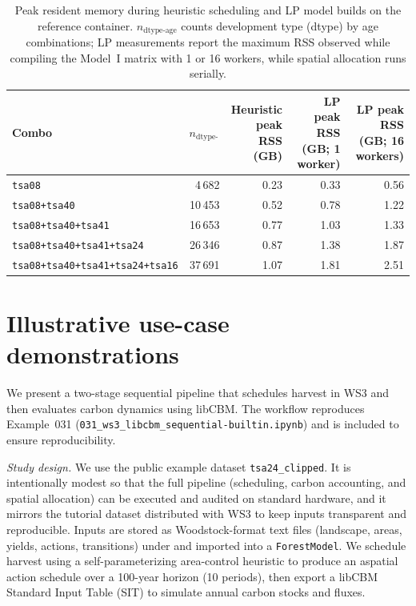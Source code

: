 \documentclass[review]{elsarticle}
\begin{document}
\begin{table}[h]
  \centering
  \caption{Peak resident memory during heuristic scheduling and LP model builds on the reference container. $n_{\text{dtype-age}}$ counts development type (dtype) by age combinations; LP measurements report the maximum RSS observed while compiling the Model~I matrix with 1 or 16 workers, while spatial allocation runs serially.}
  \label{tab:scaling_summary}
  \begin{tabular}{lrrrr}
    \toprule
    Combo & $n_{\text{dtype-age}}$ & \shortstack[c]{Heuristic\\peak RSS\\(GB)} & \shortstack[c]{LP peak RSS\\(GB; 1 worker)} & \shortstack[c]{LP peak RSS\\(GB; 16 workers)} \\
    \midrule
    \texttt{tsa08} & 4\,682 & 0.23 & 0.33 & 0.56 \\
    \texttt{tsa08+tsa40} & 10\,453 & 0.52 & 0.78 & 1.22 \\
    \texttt{tsa08+tsa40+tsa41} & 16\,653 & 0.77 & 1.03 & 1.33 \\
    \texttt{tsa08+tsa40+tsa41+tsa24} & 26\,346 & 0.87 & 1.38 & 1.87 \\
    \texttt{tsa08+tsa40+tsa41+tsa24+tsa16} & 37\,691 & 1.07 & 1.81 & 2.51 \\
    \bottomrule
  \end{tabular}
\end{table}


\section{Illustrative use-case demonstrations}
\label{sec:usecase}
We present a two-stage sequential pipeline that schedules harvest in WS3 and then evaluates carbon dynamics using libCBM. The workflow reproduces Example~031 (\texttt{031\_ws3\_libcbm\_sequential-builtin.ipynb}) and is included to ensure reproducibility.

\emph{Study design.} We use the public example dataset \texttt{tsa24\_clipped}. It is intentionally modest so that the full pipeline (scheduling, carbon accounting, and spatial allocation) can be executed and audited on standard hardware, and it mirrors the tutorial dataset distributed with WS3 to keep inputs transparent and reproducible. Inputs are stored as Woodstock-format text files (landscape, areas, yields, actions, transitions) under  and imported into a \texttt{ForestModel}. We schedule harvest using a self-parameterizing area-control heuristic to produce an aspatial action schedule over a 100-year horizon (10 periods), then export a libCBM Standard Input Table (SIT) to simulate annual carbon stocks and fluxes.
\end{document}
